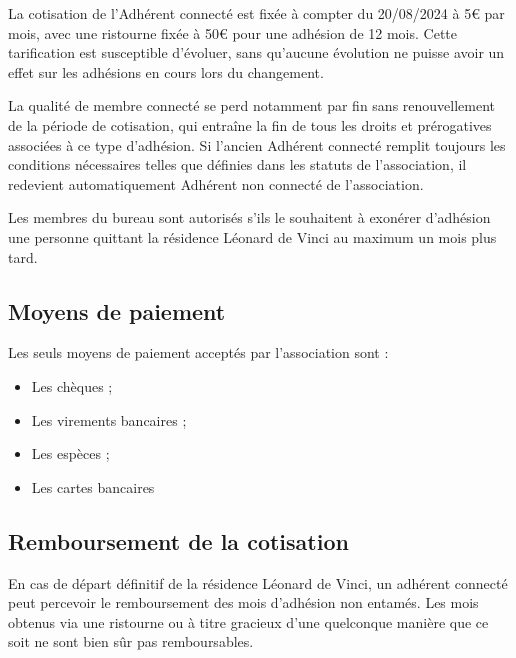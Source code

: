 \documentclass[12pt, a4paper]{article}
\begin{document}
	\bigskip

	La cotisation de l'Adhérent connecté est fixée à compter du 20/08/2024 à 5€
	par mois, avec une ristourne fixée à 50€ pour une adhésion de 12 mois. Cette
	tarification est susceptible d'évoluer, sans qu'aucune évolution ne puisse
	avoir un effet sur les adhésions en cours lors du changement.

	\bigskip

	La qualité de membre connecté se perd notamment par fin sans renouvellement de
	la période de cotisation, qui entraîne la fin de tous les droits et
	prérogatives associées à ce type d'adhésion. Si l'ancien Adhérent connecté remplit
	toujours les conditions nécessaires telles que définies dans les statuts de l'association,
	il redevient automatiquement Adhérent non connecté de l'association.

	\bigskip

	Les membres du bureau sont autorisés s'ils le souhaitent à exonérer d'adhésion
	une personne quittant la résidence Léonard de Vinci au maximum un mois plus tard.

	\subsection{Moyens de paiement}

	Les seuls moyens de paiement acceptés par l'association sont :

    \bigskip

	\begin{itemize}
		\item[\textbullet] Les chèques ;

		\item[\textbullet] Les virements bancaires ;

		\item[\textbullet] Les espèces ;

		\item[\textbullet] Les cartes bancaires
	\end{itemize}

	\subsection{Remboursement de la cotisation}

	En cas de départ définitif de la résidence Léonard de Vinci, un adhérent
	connecté peut percevoir le remboursement des mois d'adhésion non entamés. Les
	mois obtenus via une ristourne ou à titre gracieux d'une quelconque manière que
	ce soit ne sont bien sûr pas remboursables.
\end{document}
